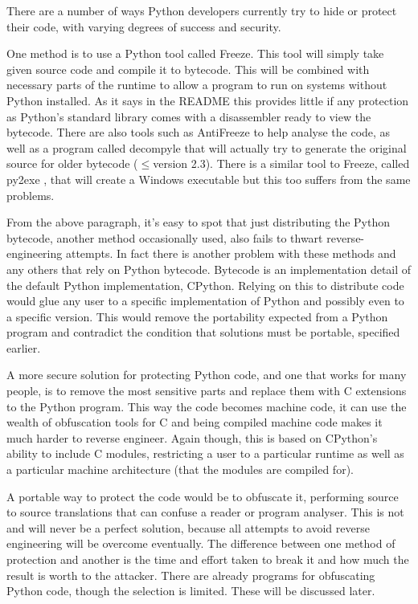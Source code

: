 \documentclass[twoside,a4paper]{report}
\begin{document}
There are a number of ways Python developers currently try to hide or protect their code, with varying degrees
of success and security.

One method is to use a Python tool called Freeze. This tool will simply take given source code and compile
it to bytecode. This will be combined with necessary parts of the runtime to allow a program to run
on systems without Python installed. As it says in the README \cite{freezereadme} this provides little if any
protection as Python's standard library comes with a disassembler ready to view the bytecode. There are also
tools such as AntiFreeze \cite{pirates} to help analyse the code, as well as a program called
decompyle \cite{decompyle} that will actually try to generate the original source for older bytecode ($\le$version
2.3). There is a similar tool to Freeze, called py2exe \cite{py2exe}, that will create a Windows executable but
this too suffers from the same problems.

From the above paragraph, it's easy to spot that just distributing the Python bytecode, another method occasionally
used, also fails to thwart reverse-engineering attempts. In fact there is another problem
with these methods and any others that rely on Python bytecode. Bytecode is an implementation detail \cite{dis}
of the default Python implementation, CPython. Relying on this to distribute code would glue any
user to a specific implementation of Python and possibly even to a specific version. This would remove the portability
expected from a Python program and contradict the condition that solutions must be portable, specified earlier.

A more secure solution for protecting Python code, and one that works for many people, is to remove the most
sensitive parts and replace them with C extensions to the Python program. This way the code becomes machine
code, it can use the wealth of obfuscation tools for C and being compiled machine code makes it much
harder to reverse engineer. Again though, this is based on CPython's ability to include C modules, restricting a
user to a particular runtime as well as a particular machine architecture (that the modules are compiled for).

A portable way to protect the code would be to obfuscate it, performing source to source translations that can
confuse a reader or program analyser. This is not and will never be a perfect solution, because all attempts
to avoid reverse engineering will be overcome eventually. The difference between one method of protection and
another is the time and effort taken to break it and how much the result is worth to the attacker. There are already
programs for obfuscating Python code, though the selection is limited. These will be discussed later.
\end{document}
